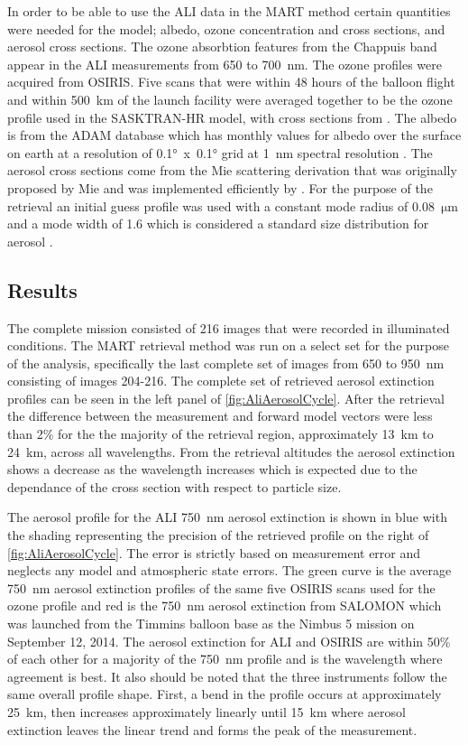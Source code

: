 \documentclass[12pt]{article}
\begin{document}
In order to be able to use the ALI data in the MART method certain quantities were needed for the model; albedo, ozone concentration and cross sections, and aerosol cross 
sections. The ozone absorbtion features from the Chappuis band appear in the ALI measurements from 650 to 700~nm. The ozone profiles were acquired from OSIRIS. Five scans that 
were within 48 hours of the balloon flight and within 500~km of the launch facility were averaged together to be the ozone profile used in the SASKTRAN-HR model, with cross 
sections from \cite{Burrows1999}. The albedo is from the ADAM database which has monthly values for albedo over the surface on earth at a resolution of 
0.1\si{\degree}~x~0.1\si{\degree} grid at 1~nm spectral resolution \citep{Muller2013}. The aerosol cross sections come from the Mie scattering derivation that was originally 
proposed by Mie and was implemented efficiently by \cite{Wiscombe1980}. For the purpose of the retrieval an initial guess profile was used with a constant mode radius of 
0.08~$\si{\micro\metre}$  and a mode width of 1.6 which is considered a standard size distribution for aerosol \citep{Deshler2003}.

\subsection{Results}

The complete mission consisted of 216 images that were recorded in illuminated conditions. The MART retrieval method was run on a select set for the purpose of the analysis, 
specifically the last complete set of images from 650 to 950~nm consisting of images 204-216. The complete set of retrieved aerosol extinction profiles can be seen in the left 
panel of \autoref{fig:AliAerosolCycle}. After the retrieval the difference between the measurement and forward model vectors were less than 2\% for the the majority of the 
retrieval region, approximately 13~km to 24~km, across all wavelengths. From the retrieval altitudes the aerosol extinction shows a decrease as the wavelength increases which is 
expected due to the dependance of the cross section with respect to particle size.

The aerosol profile for the ALI 750~nm aerosol extinction is shown in blue with the shading representing the precision of the retrieved profile on the right of 
\autoref{fig:AliAerosolCycle}. The error is strictly based on measurement error and neglects any model and atmospheric state errors. The green curve is the average 750~nm 
aerosol extinction profiles of the same five OSIRIS scans used for the ozone profile and red is the 750~nm aerosol extinction from SALOMON \citep{Berthet2002} which was launched 
from the Timmins balloon base as the Nimbus 5 mission on September 12, 2014. The aerosol extinction for ALI and OSIRIS are within 50\% of each other for a majority of the 750~nm 
profile and is the wavelength where agreement is best. It also should be noted that the three instruments follow the same overall profile shape.  First, a bend in the profile 
occurs at approximately 25~km, then increases approximately linearly until 15~km where aerosol extinction leaves the linear trend and forms the peak of the measurement. 
\end{document}
